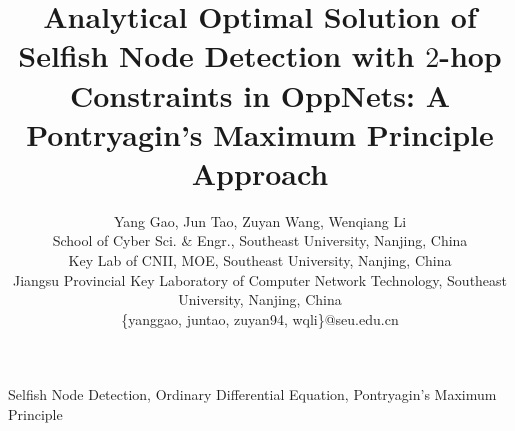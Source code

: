 \documentclass[conference]{IEEEtran}
\begin{document}
%
\title{
Analytical Optimal Solution of Selfish Node Detection with $2$-hop Constraints in OppNets: A Pontryagin's Maximum Principle Approach
}
\author{Yang Gao, Jun Tao, Zuyan Wang, Wenqiang Li\\
        School of Cyber Sci. \& Engr., Southeast University, Nanjing, China\\
        Key Lab of CNII, MOE, Southeast University, Nanjing, China\\
        Jiangsu Provincial Key Laboratory of Computer Network Technology, Southeast University, Nanjing, China\\
        \{yanggao, juntao, zuyan94, wqli\}@seu.edu.cn
        }
\maketitle



%
\begin{IEEEkeywords}
Selfish Node Detection, Ordinary Differential Equation, Pontryagin's Maximum Principle
\end{IEEEkeywords}












\end{document}
